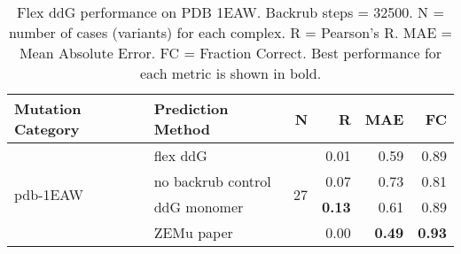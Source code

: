 \begin{table}
  \begin{tabular}{llrrrr}
\toprule
Mutation Category &   Prediction Method &   N &    R &  MAE &   FC \\
\midrule
 \multirow{ 4}{*}{pdb-1EAW} & flex ddG & \multirow{ 4}{*}{27} & 0.01 & 0.59 & 0.89  \\
 & no backrub control & & 0.07 & 0.73 & 0.81  \\
 & ddG monomer & & \textbf{0.13} & 0.61 & 0.89  \\
 & ZEMu paper & & 0.00 & \textbf{0.49} & \textbf{0.93}  \\
\bottomrule
\end{tabular}
  \caption[Flex ddG performance on PDB 1EAW]{
    Flex ddG performance on PDB 1EAW. Backrub steps = 32500. N = number of cases (variants) for each complex. R = Pearson's R. MAE = Mean Absolute Error. FC = Fraction Correct. Best performance for each metric is shown in bold.
  } \label{tab:table-pdb-1EAW}
\end{table}
